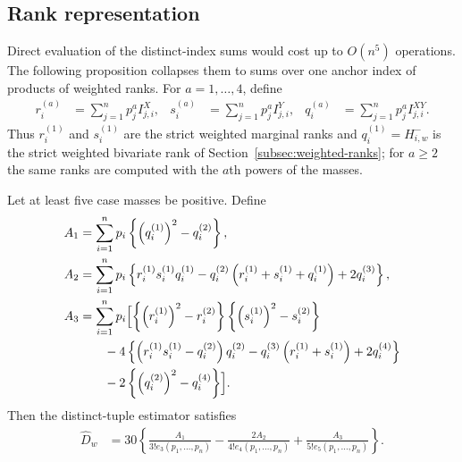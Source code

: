 \subsection{Rank representation}

Direct evaluation of the distinct-index sums would cost up to $O(n^5)$
operations. The following proposition collapses them to sums over one anchor
index of products of weighted ranks. For $a=1,\ldots,4$, define
\begin{align*}
    r_i^{(a)}
    &= \sum_{j=1}^n p_j^a I_{j,i}^X,
    &
    s_i^{(a)}
    &= \sum_{j=1}^n p_j^a I_{j,i}^Y,
    &
    q_i^{(a)}
    &= \sum_{j=1}^n p_j^a I_{j,i}^{XY}.
\end{align*}
Thus $r_i^{(1)}$ and $s_i^{(1)}$ are the strict weighted marginal ranks and
$q_i^{(1)} = H_{i,w}^{-}$ is the strict weighted bivariate rank of
Section~\ref{subsec:weighted-ranks}; for $a\geq2$ the same ranks are computed
with the $a$th powers of the masses.

\begin{proposition}
\label{prop:weighted-hoeffding-ranks}
Let at least five case masses be positive. Define
\begin{align*}
  A_1
  &= \sum_{i=1}^n p_i
     \left\{\left(q_i^{(1)}\right)^2-q_i^{(2)}\right\},\\
  A_2
  &= \sum_{i=1}^n p_i
     \left\{
       r_i^{(1)}s_i^{(1)}q_i^{(1)}
       -q_i^{(2)}\left(r_i^{(1)}+s_i^{(1)}+q_i^{(1)}\right)
       +2q_i^{(3)}
     \right\},\\
  A_3
  &= \sum_{i=1}^n p_i
     \Bigl[
       \left\{\left(r_i^{(1)}\right)^2-r_i^{(2)}\right\}
       \left\{\left(s_i^{(1)}\right)^2-s_i^{(2)}\right\}\\
  &\qquad
       -4\left\{
         \left(r_i^{(1)}s_i^{(1)}-q_i^{(2)}\right)q_i^{(2)}
         -q_i^{(3)}\left(r_i^{(1)}+s_i^{(1)}\right)
         +2q_i^{(4)}
       \right\}\\
  &\qquad
       -2\left\{\left(q_i^{(2)}\right)^2-q_i^{(4)}\right\}
     \Bigr].
\end{align*}
Then the distinct-tuple estimator satisfies
\begin{align*}
  \widehat D_w
  &= 30\left\{
       \frac{A_1}{3!e_3(p_1,\ldots,p_n)}
       -\frac{2A_2}{4!e_4(p_1,\ldots,p_n)}
       +\frac{A_3}{5!e_5(p_1,\ldots,p_n)}
     \right\}.
\end{align*}
\end{proposition}

